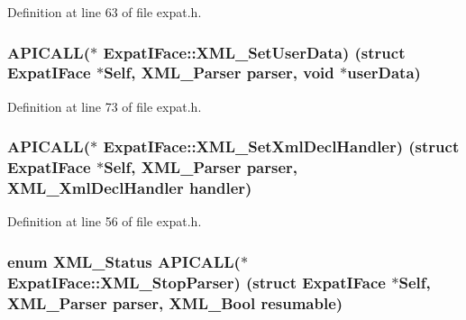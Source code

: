 Definition at line 63 of file expat.\+h.

\subsubsection[{\texorpdfstring{X\+M\+L\+\_\+\+Set\+User\+Data}{XML_SetUserData}}]{ A\+P\+I\+C\+A\+LL($\ast$ Expat\+I\+Face\+::\+X\+M\+L\+\_\+\+Set\+User\+Data) (struct {\bf Expat\+I\+Face} $\ast$Self, {\bf X\+M\+L\+\_\+\+Parser} parser, {\bf void} $\ast${\bf user\+Data})}\hypertarget{struct_expat_i_face_a4bfa8ae639dafc6c3fb781e2d2475eca}{}\label{struct_expat_i_face_a4bfa8ae639dafc6c3fb781e2d2475eca}


Definition at line 73 of file expat.\+h.

\subsubsection[{\texorpdfstring{X\+M\+L\+\_\+\+Set\+Xml\+Decl\+Handler}{XML_SetXmlDeclHandler}}]{ A\+P\+I\+C\+A\+LL($\ast$ Expat\+I\+Face\+::\+X\+M\+L\+\_\+\+Set\+Xml\+Decl\+Handler) (struct {\bf Expat\+I\+Face} $\ast$Self, {\bf X\+M\+L\+\_\+\+Parser} parser, {\bf X\+M\+L\+\_\+\+Xml\+Decl\+Handler} handler)}\hypertarget{struct_expat_i_face_ac952b1c2a72b22596d141c6d340af7b7}{}\label{struct_expat_i_face_ac952b1c2a72b22596d141c6d340af7b7}


Definition at line 56 of file expat.\+h.

\subsubsection[{\texorpdfstring{X\+M\+L\+\_\+\+Stop\+Parser}{XML_StopParser}}]{\setlength{\rightskip}{0pt plus 5cm}enum {\bf X\+M\+L\+\_\+\+Status} A\+P\+I\+C\+A\+LL($\ast$ Expat\+I\+Face\+::\+X\+M\+L\+\_\+\+Stop\+Parser) (struct {\bf Expat\+I\+Face} $\ast$Self, {\bf X\+M\+L\+\_\+\+Parser} parser, {\bf X\+M\+L\+\_\+\+Bool} resumable)}\hypertarget{struct_expat_i_face_ae45b7afcd50f3d99af64b533ce171bd8}{}\label{struct_expat_i_face_ae45b7afcd50f3d99af64b533ce171bd8}


